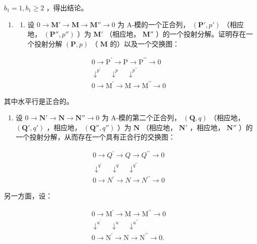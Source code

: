  \(b_{1} = 1, b_{1} \geqslant 2\) ，得出结论。

\begin{enumerate}
\def\labelenumi{\arabic{enumi})}
\setcounter{enumi}{15}
\tightlist
\item
  \begin{enumerate}
  \def\labelenumii{\alph{enumii})}
  \tightlist
  \item
    设 \(0 \to \mathbf{M}' \to \mathbf{M} \to \mathbf{M}'' \to 0\) 为 A-模的一个正合列， \((\mathbf{P}', p')\) （相应地， \((\mathbf{P}'', p'')\) ）为 \(\mathbf{M}'\) （相应地， \(\mathbf{M}''\) ）的一个投射分解。证明存在一个投射分解 \((\mathbf{P}, p)\) （ \(\mathbf{M}\) 的）以及一个交换图：
  \end{enumerate}
\end{enumerate}

\[
\begin{array}{c} 0 \to \mathrm{P} ^ {\prime} \to \mathrm{P} \to \mathrm{P} ^ {\prime \prime} \to 0 \\ \downarrow^ {p ^ {\prime}} \quad \downarrow^ {p} \quad \downarrow^ {p ^ {\prime \prime}} \\ 0 \to \mathrm{M} ^ {\prime} \to \mathrm{M} \to \mathrm{M} ^ {\prime \prime} \to 0 \end{array}
\]

其中水平行是正合的。

\begin{enumerate}
\def\labelenumi{\alph{enumi})}
\setcounter{enumi}{1}
\tightlist
\item
  设 \(0 \to \mathbf{N}' \to \mathbf{N} \to \mathbf{N}'' \to 0\) 为 A-模的第二个正合列， \((\mathbf{Q}, q)\) （相应地， \((\mathbf{Q}', q')\) ，相应地， \((\mathbf{Q}'', q'')\) ）为 \(\mathbf{N}\) （相应地， \(\mathbf{N}'\) ，相应地， \(\mathbf{N}''\) ）的一个投射分解，从而存在一个具有正合行的交换图：
\end{enumerate}

\[
\begin{array}{c}0 \rightarrow Q ^ {\prime} \rightarrow Q \rightarrow Q ^ {\prime \prime} \rightarrow 0\\\downarrow^ {q ^ {\prime}} \quad \downarrow^ {q} \quad \downarrow^ {q ^ {\prime \prime}}\\0 \rightarrow N ^ {\prime} \rightarrow N \rightarrow N ^ {\prime \prime} \rightarrow 0\end{array}
\]

另一方面，设：

\[
\begin{array}{c} 0 \to \mathrm{M} ^ {\prime} \to \mathrm{M} \to \mathrm{M} ^ {\prime \prime} \to 0 \\ \downarrow^ {u ^ {\prime}} \quad \downarrow^ {u} \quad \downarrow^ {u ^ {\prime \prime}} \\ 0 \to \mathrm{N} ^ {\prime} \to \mathrm{N} \to \mathrm{N} ^ {\prime \prime} \to 0. \end{array}
\]

